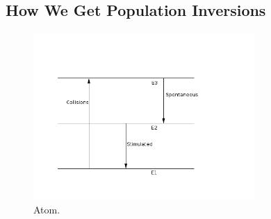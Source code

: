 \documentclass{article}
\begin{document}
\subsection{ How We Get Population Inversions }

\begin{figure}
    \centering
    \includegraphics[width=0.75\textwidth]{figures/Atom.png}
    \caption{Atom.}
    \label{fig:atom}
\end{figure}
\end{document}
